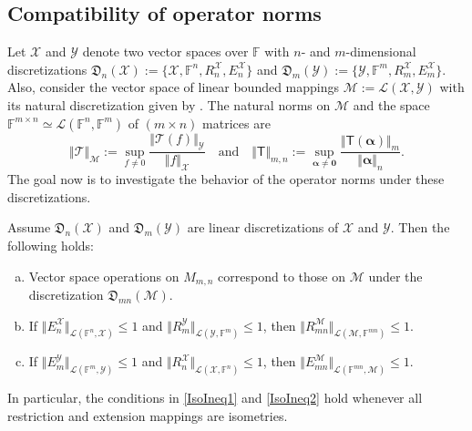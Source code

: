 \documentclass[a4paper]{paper}
\newcommand{\Discr}{\mathfrak{D}}
\newcommand{\Spc}[1]{\mathscr{#1}}
\newcommand{\Field}{\mathbb{F}}
\newcommand{\Op}[1]{\mathcal{#1}}
\newcommand{\DiscOp}[1]{\mathsf{#1}}
\newcommand*{\EXT}[2]{\ensuremath{E_{#1}^{#2}}}
\newcommand*{\REST}[2]{\ensuremath{R_{#1}^{#2}}}
\newcommand*{\RnX}{\ensuremath{\REST{n}{\Spc{X}}}}
\newcommand*{\RmX}{\ensuremath{\REST{m}{\Spc{X}}}}
\newcommand*{\RmY}{\ensuremath{\REST{m}{\Spc{Y}}}}
\newcommand*{\EnX}{\ensuremath{\EXT{n}{\Spc{X}}}}
\newcommand*{\EmX}{\ensuremath{\EXT{m}{\Spc{X}}}}
\newcommand*{\EmY}{\ensuremath{\EXT{m}{\Spc{Y}}}}
\newcommand{\vzero}{\boldsymbol{0}}
\newcommand{\valpha}{\boldsymbol{\alpha}}
\begin{document}
\subsection{Compatibility of operator norms}
Let $\Spc{X}$ and $\Spc{Y}$ denote two vector spaces over $\Field$ with 
$n$- and $m$-dimensional discretizations 
$\Discr_{n}(\Spc{X}) := \{ \Spc{X}, \Field^{n}, \RnX,\EnX \}$
and 
$\Discr_{m}(\Spc{Y}) := \{ \Spc{Y}, \Field^{m}, \RmX, \EmX \}$.
Also, consider the vector space of linear bounded mappings $\Spc{M}:=\Spc{L}(\Spc{X},\Spc{Y})$ 
with its natural discretization given by .
The natural norms on $\Spc{M}$ and the space $\Field^{m \times n} \simeq \Spc{L}(\Field^n,\Field^m)$ 
of $(m \times n)$ matrices 
are 
\[  \Vert \Op{T} \Vert_{\Spc{M}} := \sup_{f \neq 0} \frac{\bigl\Vert \Op{T}(f) \bigr\Vert_{\Spc{Y}}}{\Vert f 
\Vert_{\Spc{X}}} 
   \quad\text{and}\quad
   \Vert \DiscOp{T} \Vert_{m,n} := \sup_{\valpha \neq \vzero} 
     \frac{\bigl\Vert \DiscOp{T}(\valpha) \bigr\Vert_{m}}{\Vert \valpha \Vert_{n}}. 
\]
The goal now is to investigate the behavior of the operator norms under these discretizations.
\begin{theorem}
Assume $\Discr_{n}(\Spc{X})$ and $ \Discr_{m}(\Spc{Y})$ are linear discretizations of 
$\Spc{X}$ and $\Spc{Y}$. Then the following holds:
\begin{enumerate}[(a)]
\item Vector space operations on $M_{m,n}$ correspond to those on 
$\Spc{M}$ under the discretization $\Discr_{m n}(\Spc{M})$.
\item If 
  $\Vert \EnX \Vert_{\Spc{L}(\Field^n, \Spc{X})} \leq 1$
  and 
 $\Vert \RmY \Vert_{\Spc{L}(\Spc{Y},\Field^m)} \leq 1$,
 then $\Vert R_{m n}^{\Spc{M}} \Vert_{\Spc{L}(\Spc{M},\Field^{mn})} \leq 1$.%
 \label{IsoIneq1}%
\item If 
  $\Vert \EmY \Vert_{\Spc{L}(\Field^m, \Spc{Y})} \leq 1$ 
  and
  $\Vert \RnX \Vert_{\Spc{L}(\Spc{X},\Field^n)} \leq 1$, 
  then $\Vert E_{m n}^{\Spc{M}} \Vert_{\Spc{L}(\Field^{mn}, \Spc{M})} \leq 1$.%
  \label{IsoIneq2}%
\end{enumerate}
In particular, the conditions in \eqref{IsoIneq1} and \eqref{IsoIneq2} hold whenever all restriction and extension 
mappings 
are isometries.
\end{theorem}
\end{document}
